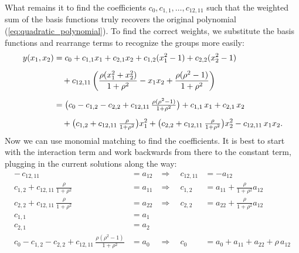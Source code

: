 What remains it to find the coefficients $c_0, c_{1,1}, \dots, c_{12, 11}$ such that the weighted sum of the basis functions truly recovers the original polynomial (\autoref{eq:quadratic_polynomial}).
To find the correct weights, we substitute the basis functions and rearrange terms to recognize the groups more easily:
\begin{align*}
y(x_1,x_2) &= c_0 + c_{1,1} x_1 + c_{2,1} x_2 
+ c_{1,2}(x_1^2 - 1) + c_{2,2}(x_2^2 - 1) \notag \\[0.5em]
&\quad + c_{12, 11}\left( \frac{\rho(x_1^2 + x_2^2)}{1 + \rho^2} 
- x_1 x_2 
+ \frac{\rho(\rho^2 - 1)}{1 + \rho^2} \right) \\[0.5em]
&= 
\big( c_0 - c_{1,2} - c_{2,2} + c_{12, 11}\,\tfrac{\rho(\rho^2 - 1)}{1+\rho^2} \big)
+ c_{1,1}\,x_1 
+ c_{2,1}\,x_2 \notag \\[0.5em]
&\quad + \big( c_{1,2} + c_{12, 11}\,\tfrac{\rho}{1+\rho^2} \big) x_1^2
+ \big( c_{2,2} + c_{12, 11}\,\tfrac{\rho}{1+\rho^2} \big) x_2^2
- c_{12, 11}\, x_1 x_2.
\end{align*}
Now we can use monomial matching to find the coefficients. It is best to start with the interaction term and work backwards from there to the constant term, plugging in the current solutions along the way:
\begin{align*}
-\,c_{12, 11} &= a_{12} &\Rightarrow\quad c_{12, 11} &= -a_{12} \\[0.5em]
c_{1,2} + c_{12, 11}\,\tfrac{\rho}{1+\rho^2} &= a_{11} 
&\Rightarrow\quad c_{1,2} &= a_{11} + \tfrac{\rho}{1+\rho^2}a_{12} \\[0.5em]
c_{2,2} + c_{12, 11}\,\tfrac{\rho}{1+\rho^2} &= a_{22} 
&\Rightarrow\quad c_{2,2} &= a_{22} + \tfrac{\rho}{1+\rho^2}a_{12} \\[0.5em]
c_{1,1} &= a_1 \\[0.5em]
c_{2,1} &= a_2 \\[0.5em]
c_0 - c_{1,2} - c_{2,2} + c_{12, 11}\,\tfrac{\rho(\rho^2 - 1)}{1+\rho^2} &= a_0 
&\Rightarrow\quad 
c_0 &= a_0 + a_{11} + a_{22} + \rho\,a_{12}
\end{align*}

